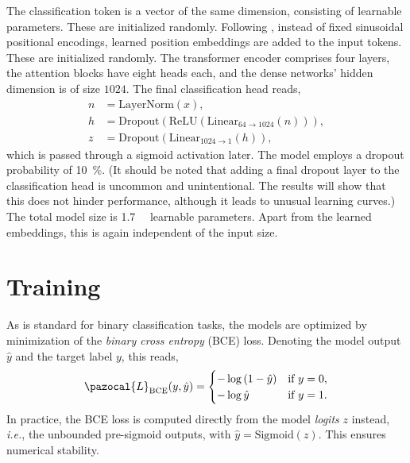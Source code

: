 The classification token is a vector of the same dimension, consisting of learnable parameters. These are initialized randomly. Following \cite{dosovitskiy2021an}, instead of fixed sinusoidal positional encodings, learned position embeddings are added to the input tokens. These are initialized randomly.
The transformer encoder comprises four layers, the attention blocks have eight heads each, and the dense networks' hidden dimension is of size $1024$. The final classification head reads, 
\begin{equation}
\begin{aligned}
	n &= \mathrm{LayerNorm}(x),\\
	h &= \mathrm{Dropout}(\mathrm{ReLU}(\mathrm{Linear}_{64\rightarrow1024}(n))),\\
	z &= \mathrm{Dropout}(\mathrm{Linear}_{1024\rightarrow1}(h)),
\end{aligned}
\end{equation}
which is passed through a sigmoid activation later.
The model employs a dropout probability of \SI{10}{\percent}. (It should be noted that adding a final dropout layer to the classification head is uncommon and unintentional. The results will show that this does not hinder performance, although it leads to unusual learning curves.) The total model size is \SI{1.7}{\mega\nothing} learnable parameters. Apart from the learned embeddings, this is again independent of the input size.

\section{Training}


As is standard for binary classification tasks, the models are optimized by minimization of the \emph{binary cross entropy} (BCE) loss. Denoting the model output $\hat{y}$ and the target label $y$, this reads,
\begin{equation}
	\pazocal{L}_\text{BCE}(y,\hat{y}) = \begin{cases}
		-\log{(1-\hat{y})} & \text{if $y=0$,} \\
		-\log{\hat{y}} & \text{if $y=1$.} 
	\end{cases}
\end{equation}
In practice, the BCE loss is computed directly from the model \emph{logits} $z$ instead, \emph{i.e.}, the unbounded pre-sigmoid outputs, with $\hat{y} = \text{Sigmoid}(z)$. This ensures numerical stability. 

